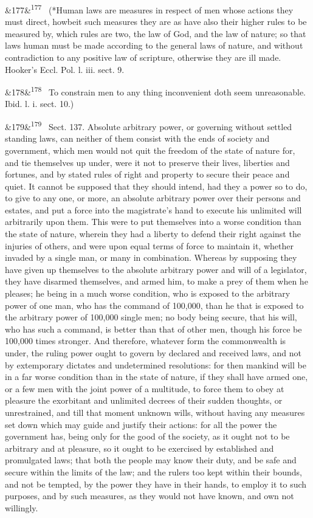 \documentclass[12pt]{article}
\newcommand{\para}[1][]{\par\noindent\ifx&#1&\else\textsuperscript{\footnotesize #1}~\fi}
\begin{document}
\para[177] (*Human laws are measures in respect of men whose actions they must direct, howbeit such measures they are as have also their higher rules to be measured by, which rules are two, the law of God, and the law of nature; so that laws human must be made according to the general laws of nature, and without contradiction to any positive law of scripture, otherwise they are ill made. Hooker's Eccl. Pol. l. iii. sect. 9.

\para[178] To constrain men to any thing inconvenient doth seem unreasonable. Ibid. l. i. sect. 10.)

\para[179] Sect. 137. Absolute arbitrary power, or governing without settled standing laws, can neither of them consist with the ends of society and government, which men would not quit the freedom of the state of nature for, and tie themselves up under, were it not to preserve their lives, liberties and fortunes, and by stated rules of right and property to secure their peace and quiet. It cannot be supposed that they should intend, had they a power so to do, to give to any one, or more, an absolute arbitrary power over their persons and estates, and put a force into the magistrate's hand to execute his unlimited will arbitrarily upon them. This were to put themselves into a worse condition than the state of nature, wherein they had a liberty to defend their right against the injuries of others, and were upon equal terms of force to maintain it, whether invaded by a single man, or many in combination. Whereas by supposing they have given up themselves to the absolute arbitrary power and will of a legislator, they have disarmed themselves, and armed him, to make a prey of them when he pleases; he being in a much worse condition, who is exposed to the arbitrary power of one man, who has the command of 100,000, than he that is exposed to the arbitrary power of 100,000 single men; no body being secure, that his will, who has such a command, is better than that of other men, though his force be 100,000 times stronger. And therefore, whatever form the commonwealth is under, the ruling power ought to govern by declared and received laws, and not by extemporary dictates and undetermined resolutions: for then mankind will be in a far worse condition than in the state of nature, if they shall have armed one, or a few men with the joint power of a multitude, to force them to obey at pleasure the exorbitant and unlimited decrees of their sudden thoughts, or unrestrained, and till that moment unknown wills, without having any measures set down which may guide and justify their actions: for all the power the government has, being only for the good of the society, as it ought not to be arbitrary and at pleasure, so it ought to be exercised by established and promulgated laws; that both the people may know their duty, and be safe and secure within the limits of the law; and the rulers too kept within their bounds, and not be tempted, by the power they have in their hands, to employ it to such purposes, and by such measures, as they would not have known, and own not willingly.
\end{document}
